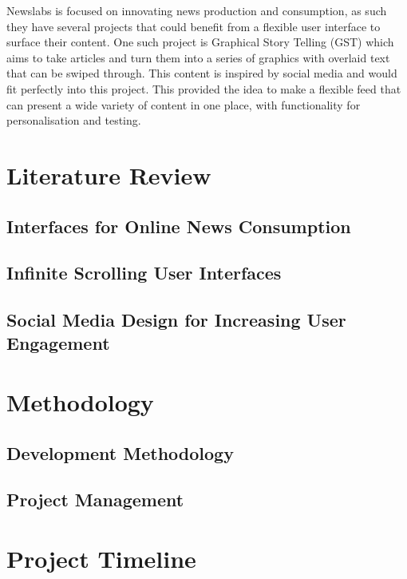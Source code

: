 \documentclass[12pt,titlepage]{article}
\begin{document}
  Newslabs is focused on innovating news production and consumption, as such
  they have several projects that could benefit from a flexible user interface
  to surface their content. One such project is Graphical Story Telling (GST)
  which aims to take articles and turn them into a series of graphics with
  overlaid text that can be swiped through. This content is inspired by social
  media and would fit perfectly into this project. This provided the idea to
  make a flexible feed that can present a wide variety of content in one place,
  with functionality for personalisation and testing.

\section{Literature Review}

  \subsection{Interfaces for Online News Consumption}

  \subsection{Infinite Scrolling User Interfaces}

  \subsection{Social Media Design for Increasing User Engagement}

\section{Methodology}

  \subsection{Development Methodology}

  \subsection{Project Management}

\section{Project Timeline}


{}

\end{document}
